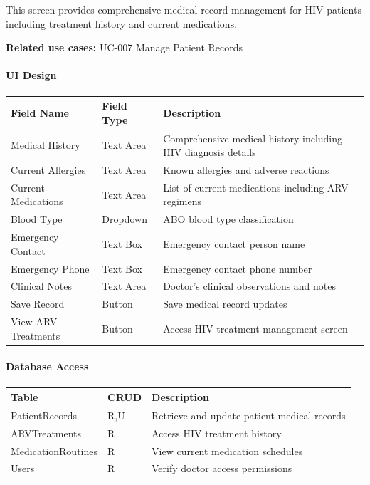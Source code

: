 \documentclass[12pt,a4paper]{article}
\begin{document}
This screen provides comprehensive medical record management for HIV patients including treatment history and current medications.

\textbf{Related use cases:} UC-007 Manage Patient Records

\paragraph{UI Design}

\begin{longtable}{|p{3cm}|p{3cm}|p{8cm}|}
\hline
\textbf{Field Name} & \textbf{Field Type} & \textbf{Description} \\
\hline
Medical History & Text Area & Comprehensive medical history including HIV diagnosis details \\
\hline
Current Allergies & Text Area & Known allergies and adverse reactions \\
\hline
Current Medications & Text Area & List of current medications including ARV regimens \\
\hline
Blood Type & Dropdown & ABO blood type classification \\
\hline
Emergency Contact & Text Box & Emergency contact person name \\
\hline
Emergency Phone & Text Box & Emergency contact phone number \\
\hline
Clinical Notes & Text Area & Doctor's clinical observations and notes \\
\hline
Save Record & Button & Save medical record updates \\
\hline
View ARV Treatments & Button & Access HIV treatment management screen \\
\hline
\end{longtable}

\paragraph{Database Access}

\begin{longtable}{|p{3cm}|p{2cm}|p{9cm}|}
\hline
\textbf{Table} & \textbf{CRUD} & \textbf{Description} \\
\hline
PatientRecords & R,U & Retrieve and update patient medical records \\
\hline
ARVTreatments & R & Access HIV treatment history \\
\hline
MedicationRoutines & R & View current medication schedules \\
\hline
Users & R & Verify doctor access permissions \\
\hline
\end{longtable}
\end{document}
